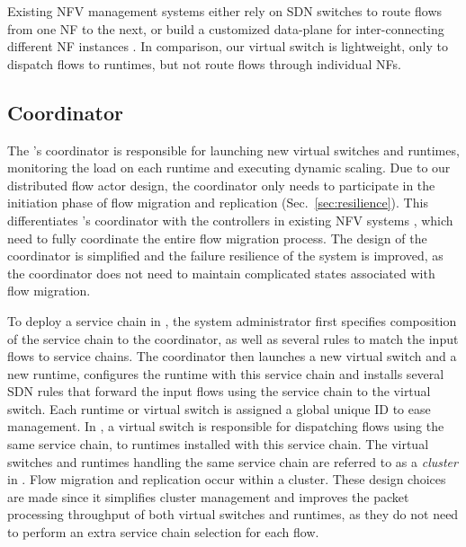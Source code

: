 
Existing NFV management systems either rely on SDN switches \cite{gember2012stratos, gember2015opennf} to route flows from one NF to the next, or build a customized data-plane for inter-connecting different NF instances \cite{palkar2015e2}. In comparison, our virtual switch is lightweight, only to dispatch flows to runtimes, but not route flows through individual NFs.


\subsection{Coordinator}
\label{sec:coordinator}

The \nfactor's coordinator is responsible for launching new virtual switches and runtimes, monitoring the load on each runtime and executing dynamic scaling. Due to our distributed flow actor design, the coordinator only needs to participate in the initiation phase of flow migration and replication (Sec.~\ref{sec:resilience}). This differentiates \nfactor's coordinator with the controllers in existing NFV systems \cite{gember2015opennf}\cite{rajagopalan2013split}, which need to fully coordinate the entire flow migration process.
The design of the coordinator is simplified and the failure resilience of the system is improved, as the coordinator does not need to maintain complicated states associated with flow migration.

To deploy a service chain in \nfactor, the system administrator first specifies composition of the service chain to the coordinator, as well as several rules to match the input flows to service chains. %
The coordinator then launches a new virtual switch and a new runtime, configures the runtime with this service chain and installs several SDN rules that forward the input flows using the service chain to the virtual switch. %
Each runtime or virtual switch is assigned a global unique ID to ease management.  In \nfactor, a virtual switch is responsible for dispatching flows using the same service chain, to runtimes installed with this service chain. The virtual switches and runtimes handling the same service chain are referred to as a {\em cluster} in \nfactor. Flow migration and replication occur within a cluster. These design choices are made since it simplifies cluster management and improves the packet processing throughput of both virtual switches and runtimes, as they do not need to perform an extra service chain selection for each flow.


